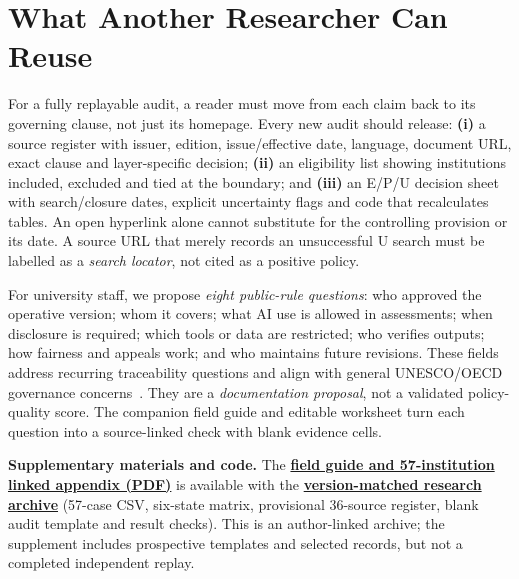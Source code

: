 \documentclass[conference,letterpaper]{IEEEtran}
\newif\ifblind
\begin{document}
\section{What Another Researcher Can Reuse}
For a fully replayable audit, a reader must move from each claim back to its governing clause, not just its homepage. Every new audit should release: \textbf{(i)} a source register with issuer, edition, issue/effective date, language, document URL, exact clause and layer-specific decision; \textbf{(ii)} an eligibility list showing institutions included, excluded and tied at the boundary; and \textbf{(iii)} an E/P/U decision sheet with search/closure dates, explicit uncertainty flags and code that recalculates tables. An open hyperlink alone cannot substitute for the controlling provision or its date. A source URL that merely records an unsuccessful U search must be labelled as a \emph{search locator}, not cited as a positive policy.

For university staff, we propose \emph{eight public-rule questions}: who approved the operative version; whom it covers; what AI use is allowed in assessments; when disclosure is required; which tools or data are restricted; who verifies outputs; how fairness and appeals work; and who maintains future revisions. These fields address recurring traceability questions and align with general UNESCO/OECD governance concerns~\cite{unesco,oecd}. They are a \emph{documentation proposal}, not a validated policy-quality score. The companion field guide and editable worksheet turn each question into a source-linked check with blank evidence cells.

\ifblind
\noindent\textbf{Supplementary materials.} An anonymous companion PDF presents the 57-institution evidence/search key, plus a practical source-coding and bilingual search template. For review-stage anonymity, repository ownership information is omitted here; author-identifying archival links will be added only if permitted by the venue.
\else
\noindent\textbf{Supplementary materials and code.} The \href{https://github.com/shaikhamalkawi-ux/From-AI-Strategy-to-University-Rules-in-the-GCC/blob/main/ICAMAC2026_Paper90_R5_57/supplement/ICAMAC_Paper90_R5_Evidence_Addendum_FieldGuide_and_57.pdf}{\textbf{field guide and 57-institution linked appendix (PDF)}} is available with the \href{https://github.com/shaikhamalkawi-ux/From-AI-Strategy-to-University-Rules-in-the-GCC/tree/main/ICAMAC2026_Paper90_R5_57}{\textbf{version-matched research archive}} (57-case CSV, six-state matrix, provisional 36-source register, blank audit template and result checks). This is an author-linked archive; the supplement includes prospective templates and selected records, but not a completed independent replay.
\fi
\end{document}
